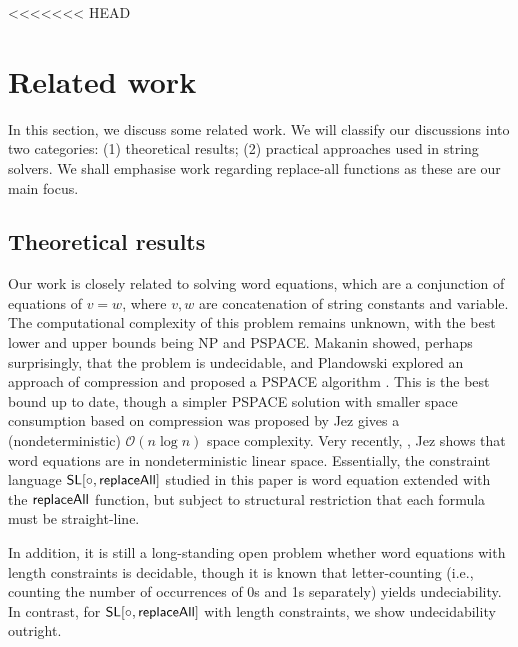 <<<<<<< HEAD

\section{Related work}

 
In this section, we discuss some related work. We will classify our discussions into two categories: (1) theoretical results; (2) practical approaches used in string solvers.  We shall emphasise work regarding replace-all functions as these are our main focus. 

\subsection*{Theoretical results}
Our work is closely related to solving word equations, which are a conjunction of equations of $v=w$, where $v, w$ are concatenation of string constants and variable. The computational complexity of this problem remains unknown, with the best lower and upper bounds being NP and PSPACE. Makanin %
showed, perhaps surprisingly, that the problem is undecidable, and %
Plandowski explored an approach of compression and proposed a PSPACE algorithm \cite{P04}.  This is the best bound up to date, though a simpler PSPACE solution with smaller space consumption based on compression was proposed by Jez \cite{J16}  gives a (nondeterministic) $\mathcal{O}(n \log n)$ space complexity. Very recently, \cite{J17}, Jez shows that word equations are in nondeterministic linear space. 
Essentially, the constraint language  $\mathsf{SL}[\circ, \mathsf{replaceAll}]$ studied in this paper is word equation extended with the $\mathsf{replaceAll}$ function, but subject to structural restriction that each formula must be straight-line.  

In addition, it is still a long-standing open problem whether word equations with length constraints is decidable, though it is known that letter-counting (i.e., counting the number of occurrences of 0s and 1s separately) yields undeciability. In contrast, for  $\mathsf{SL}[\circ, \mathsf{replaceAll}]$ with length constraints, we show undecidability outright. 




